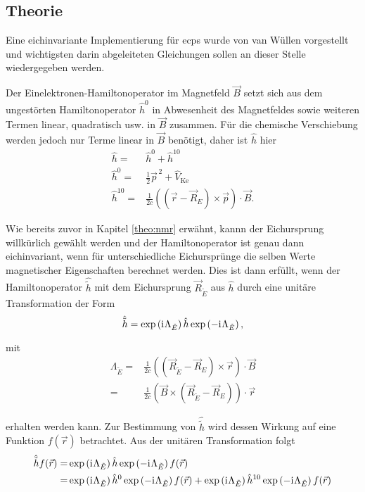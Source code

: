 	\subsection{Theorie}
	Eine eichinvariante Implementierung für \acp{ecp} wurde von van Wüllen\supercite{van2012use} vorgestellt und wichtigsten darin abgeleiteten Gleichungen sollen an dieser Stelle wiedergegeben werden. 
	
	Der Einelektronen-Hamiltonoperator im Magnetfeld $\vec{B}$ setzt sich aus dem ungestörten Hamiltonoperator $\hat{h}^0$ in Abwesenheit des Magnetfeldes sowie weiteren Termen linear, quadratisch usw. in $\vec{B}$ zusammen. Für die chemische Verschiebung werden jedoch nur Terme linear in $\vec{B}$ benötigt, daher ist $\hat{h}$ hier
	\begin{equation}\label{eq:heinel}
	\begin{aligned}
	\hat{h}=&\hat{h}^0+\hat{h}^{10}\\
	\hat{h}^0=&\frac{1}{2}\vec{p}^{\,2}+\hat{V}_{\textrm{Ke}}\\
	\hat{h}^{10}=&\frac{1}{2c}\left(\left(\vec{r}-\vec{R}_E\right)\times\vec{p}\right)\cdot\vec{B}.
	\end{aligned}
	\end{equation}
	
	Wie bereits zuvor in Kapitel \ref{theo:nmr} erwähnt, kannn der Eichursprung willkürlich gewählt werden und der Hamiltonoperator ist genau dann eichinvariant, wenn für unterschiedliche Eichursprünge die selben Werte magnetischer Eigenschaften berechnet werden. Dies ist dann erfüllt, wenn der Hamiltonoperator $\hat{\tilde{h}}$ mit dem Eichursprung $\vec{R}_{\tilde{E}}$ aus $\hat{h}$ durch eine unitäre Transformation der Form
	\begin{equation}\label{eq:trans}
	\hat{\tilde{h}}=\exp\left(\mathrm{i}\mkern1mu\Lambda_{\tilde{E}}\right)\hat{h}\exp\left(-\mathrm{i}\mkern1mu\Lambda_{\tilde{E}}\right),
	\end{equation}
	
	mit 
	\begin{equation}
	\begin{aligned}
	\Lambda_{\tilde{E}}=&\frac{1}{2c}\left(\left(\vec{R}_{\tilde{E}}-\vec{R}_E\right)\times\vec{r}\right)\cdot\vec{B}\\
	=&\frac{1}{2c}\left(\vec{B}\times\left(\vec{R}_{\tilde{E}}-\vec{R}_E\right)\right)\cdot\vec{r}
	\end{aligned}
	\end{equation}
	
	erhalten werden kann. Zur Bestimmung von $\hat{\tilde{h}}$ wird dessen Wirkung auf eine Funktion $f(\vec{r})$ betrachtet. Aus der unitären Transformation folgt
	\begin{equation}\label{eq:transh}
	\begin{aligned}
	\hat{\tilde{h}}f(\vec{r})=&\exp\left(\mathrm{i}\mkern1mu\Lambda_{\tilde{E}}\right)\hat{h}\exp\left(-\mathrm{i}\mkern1mu\Lambda_{\tilde{E}}\right)f(\vec{r})\\
	=&\exp\left(\mathrm{i}\mkern1mu\Lambda_{\tilde{E}}\right)\hat{h}^0\exp\left(-\mathrm{i}\mkern1mu\Lambda_{\tilde{E}}\right)f(\vec{r})+\exp\left(\mathrm{i}\mkern1mu\Lambda_{\tilde{E}}\right)\hat{h}^{10}\exp\left(-\mathrm{i}\mkern1mu\Lambda_{\tilde{E}}\right)f(\vec{r})
	\end{aligned}
	\end{equation}
	
